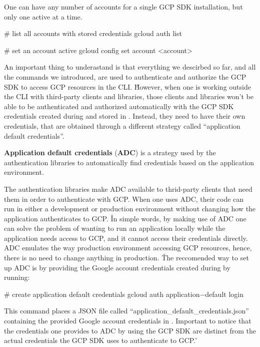 One can have any number of accounts for a single GCP SDK installation, but only one active at a time.
\begin{bash}
# list all accounts with stored credentials
gcloud auth list
\end{bash}

\begin{bash}
# set an account active
gcloud config set account <account>
\end{bash}

An important thing to underastand is that everything we descirbed so far, and all the commands we introduced, are used
to authenticate and authorize the GCP SDK to access GCP resources in the CLI. \v

However, when one is working outside the CLI with third-party clients and libraries, those clients and libraries won't
be able to be authenticated and authorized automatically with the GCP SDK credentials created during
 and stored in . Instead, they need to have their own credentials,
that are obtained through a different strategy called ``application default credentials''.

\textbf{Application default credentials} (\textbf{ADC}) is a strategy used by the authentication libraries to
automatically find credentials based on the application environment.
\ed

The authentication libraries make ADC available to thrid-party clients that need them in order to authenticate with
GCP\@. When one uses ADC, their code can run in either a development or production environment without changing how
the application authenticates to GCP. \v

In simple words, by making use of ADC one can solve the problem of wanting to run an application locally while the
application needs access to GCP, and it cannot access their credentials directly. ADC emulates the way production
environment accessing GCP resources, hence, there is no need to change anything in production. \v

The reccomended way to set up ADC is by providing the Google account credentials created during 
by running:
\begin{bash}
# create application default credentials
gcloud auth application$-$default login
\end{bash}

This command places a JSON file called ``application\_default\_credentials.json'' containing the provided Google account
credentials in . Important to notice that the
credentials one provides to ADC by using the GCP SDK are distinct from the actual credentials the GCP SDK uses to
authenticate to GCP\@. \v

